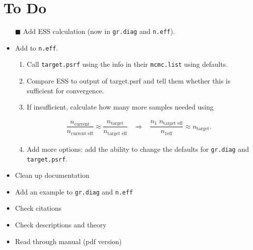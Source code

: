 \documentclass[12pt]{article}
\theoremstyle{remark}
\begin{document}
\section{To Do} %


\begin{itemize}
 \renewcommand{\labelitemi}{$\square$}
\item[$\blacksquare$]  Add ESS calculation (now in \texttt{gr.diag} and \texttt{n.eff}).
\item Add to \texttt{n.eff}. 
\begin{enumerate}
\item Call \texttt{target.psrf} using the info in their \texttt{mcmc.list} using  defaults.
\item Compare ESS to output of target.psrf and tell them whether this is sufficient for convergence.
\item If insufficient, calculate how many more samples needed using


\begin{align*}
\dfrac{n_\text{current}}{n_{ \text{current eff}}} \approx \dfrac{n_{\text{target}}}{n_{ \text{target eff}}}
\;\;\;  \Longrightarrow \;\;\;
 \dfrac{n_1 \; n_{ \text{target eff}}}{n_{1 \text{eff}}}  \approx n_{\text{target}}.
\end{align*}
\item Add more options: add the ability to change the defaults for \texttt{gr.diag} and \texttt{target.psrf}. 
\end{enumerate}

 \renewcommand{\labelitemi}{$\square$}
\item Clean up documentation
\item Add an example to \texttt{gr.diag} and \texttt{n.eff}
\item Check citations
\item Check descriptions and theory
\item Read through manual (pdf version)
\end{itemize}








\end{document}
